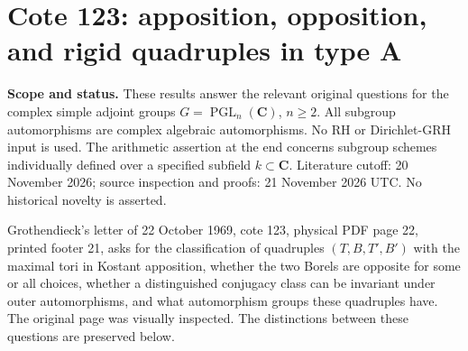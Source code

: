 \section{Cote 123: apposition, opposition, and rigid quadruples in type
A}\label{cote-123-apposition-opposition-and-rigid-quadruples-in-type-a}

\textbf{Scope and status.} These results answer the relevant original
questions for the complex simple adjoint groups
\(G=\operatorname{PGL}_n(\mathbf C)\), \(n\geq2\). All subgroup
automorphisms are complex algebraic automorphisms. No RH or
Dirichlet-GRH input is used. The arithmetic assertion at the end
concerns subgroup schemes individually defined over a specified subfield
\(k\subset\mathbf C\). Literature cutoff: 20 November 2026; source
inspection and proofs: 21 November 2026 UTC. No historical novelty is
asserted.

Grothendieck's letter of 22 October 1969, cote 123, physical PDF page
22, printed footer 21, asks for the classification of quadruples
\((T,B,T',B')\) with the maximal tori in Kostant apposition, whether the
two Borels are opposite for some or all choices, whether a distinguished
conjugacy class can be invariant under outer automorphisms, and what
automorphism groups these quadruples have. The original page was
visually inspected. The distinctions between these questions are
preserved below.


